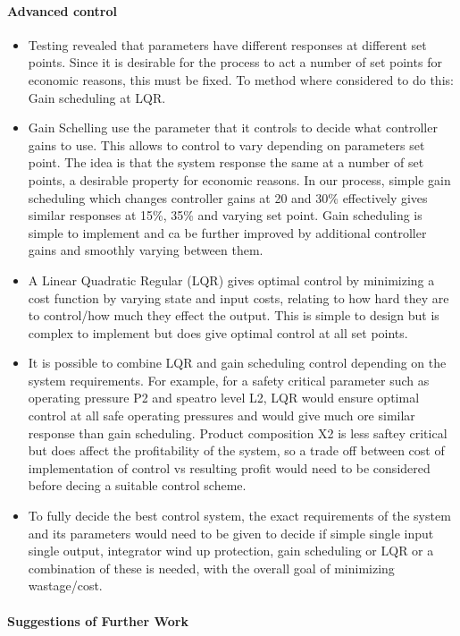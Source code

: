 \documentclass[11pt]{article}
\begin{document}
\paragraph{Advanced control}
\begin{itemize}
    \item Testing revealed that parameters have different responses at different set points. Since it is desirable for the process to act a number of set points for economic reasons, this must be fixed. To method where considered to do this: Gain scheduling at LQR.
    \item Gain Schelling use the parameter that it controls to decide what controller gains to use. This allows to control to vary depending on parameters set point. The idea is that the system response the same at a number of set points, a desirable property for economic reasons. In our process, simple gain scheduling which changes controller gains at 20 and 30\% effectively gives similar responses at 15\%, 35\% and varying set point. Gain scheduling is simple to implement and ca be further improved by additional controller gains and smoothly varying between them.
    \item A Linear Quadratic Regular (LQR) gives optimal control by minimizing a cost function by varying state and input costs, relating to how hard they are to control/how much they effect the output. This is simple to design but is complex to implement but does give optimal control at all set points.
    \item It is possible to combine LQR and gain scheduling control depending on the system requirements. For example, for a safety critical parameter such as operating pressure P2 and speatro level L2, LQR would ensure optimal control at all safe operating pressures and would give much ore similar response than gain scheduling. Product composition X2 is less saftey critical but does affect the profitability of the system, so a trade off between cost of implementation of control vs resulting profit would need to be considered before decing a suitable control scheme.
    \item To fully decide the best control system, the exact requirements of the system and its parameters would need to be given to decide if simple single input single output, integrator wind up protection, gain scheduling or LQR or a combination of these is needed, with the overall goal of minimizing wastage/cost.
\end{itemize}

\paragraph{Suggestions of Further Work}
\end{document}
